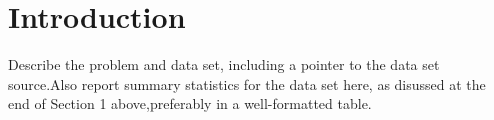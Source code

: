 \section{Introduction}
\label{sec:intro}

Describe the problem and data set,  including a pointer to the data 
set source.Also report summary statistics for the data set here, as 
disussed at the end of Section 1 above,preferably in a well-formatted 
table.